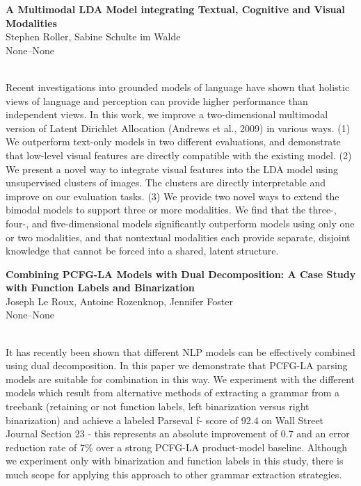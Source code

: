 \documentclass[twoside,makeidx]{book}
\begin{document}
\par\vspace{2em}\noindent%
\begin{minipage}{\linewidth}%
\begin{center}
\textbf{\normalsize A Multimodal LDA Model integrating Textual, Cognitive and Visual Modalities}\\
\normalsize  Stephen Roller,  Sabine Schulte im Walde\\
{\small None--None}\\
\end{center}
\end{minipage}\\[0.5em]
\nopagebreak%
\noindent%
{\small Recent investigations into grounded models of language have shown that holistic views of language and perception can provide higher performance than independent views. In this work, we improve a two-dimensional multimodal version of Latent Dirichlet Allocation (Andrews et al., 2009) in various ways. (1) We outperform text-only models in two different evaluations, and demonstrate that low-level visual features are directly compatible with the existing model. (2) We present a novel way to integrate visual features into the LDA model using unsupervised clusters of images. The clusters are directly interpretable and improve on our evaluation tasks. (3) We provide two novel ways to extend the bimodal models to support three or more modalities. We find that the three-, four-, and five-dimensional models significantly outperform models using only one or two modalities, and that nontextual modalities each provide separate, disjoint knowledge that cannot be forced into a shared, latent structure.}
\par\vspace{2em}\noindent%
\begin{minipage}{\linewidth}%
\begin{center}
\textbf{\normalsize Combining PCFG-LA Models with Dual Decomposition: A Case Study with Function Labels and Binarization}\\
\normalsize  Joseph Le Roux,  Antoine Rozenknop,  Jennifer Foster\\
{\small None--None}\\
\end{center}
\end{minipage}\\[0.5em]
\nopagebreak%
\noindent%
{\small It has recently been shown that different NLP models can be effectively combined using dual decomposition. In this paper we demonstrate that PCFG-LA parsing models are suitable for combination in this way. We experiment with the different models which result from alternative methods of extracting a grammar from a treebank (retaining or not function labels, left binarization versus right binarization) and achieve a labeled Parseval f- score of 92.4 on Wall Street Journal Section 23 - this represents an absolute improvement of 0.7 and an error reduction rate of 7\% over a strong PCFG-LA product-model baseline. Although we experiment only with binarization and function labels in this study, there is much scope for applying this approach to other grammar extraction strategies.}
\end{document}
